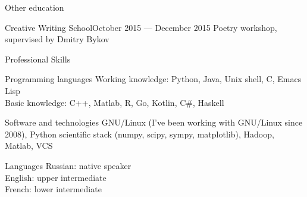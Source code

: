\documentclass{resume}
\begin{document}
\begin{rSection}{Other education}
  \begin{rSubsection}{Creative Writing School}{October 2015 --- December 2015}{}
    Poetry workshop, supervised by Dmitry Bykov
  \end{rSubsection}
\end{rSection}

\begin{rSection}{Professional Skills}
  \begin{rSubsection}{Programming languages}{}{}
    Working knowledge: Python, Java, Unix shell, C, Emacs Lisp \\
    Basic knowledge: C++, Matlab, R, Go, Kotlin, C\#, Haskell
  \end{rSubsection}

  \begin{rSubsection}{Software and technologies}{}{}
    GNU/Linux (I've been working with GNU/Linux since 2008), Python scientific stack (numpy, scipy, sympy, matplotlib), Hadoop, Matlab, VCS
  \end{rSubsection}

  \begin{rSubsection}{Languages}{}{}
    Russian: native speaker \\
    English: upper intermediate \\
    French: lower intermediate
  \end{rSubsection}
\end{rSection}
\end{document}
